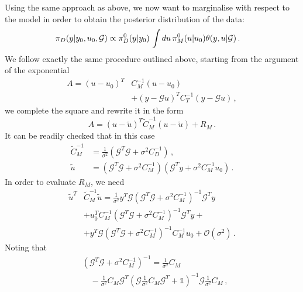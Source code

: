 Using the same approach as above, we now want to marginalise with respect to the model in order to obtain the posterior distribution of the data: 
\begin{align}
    \label{eq:MarginGaussModel}
    \pi_D(y|y_0,u_0,\mathcal{G}) 
    &\propto \pi_{D}^0(y|y_0) \, 
    \int du\, \pi_{M}^0(u|u_0) 
      \theta(y,u|\mathcal{G}) \, .
  \end{align}
We follow exactly the same procedure outlined above, starting from the argument
of the exponential
\begin{align}
    \label{eq:QuadFormModelInt}
    A = \left(u-u_0\right)^T &C_M^{-1} \left(u-u_0\right) \nonumber \\ 
    &+ \left(y-\mathcal{G}u\right)^T C_T^{-1} \left(y-\mathcal{G}u\right)\, ,
\end{align}
we complete the square and rewrite it in the form
\begin{equation}
    \label{eq:QuadFormModelIntSquare}
    A = \left(u-\tilde{u}\right)^T 
    \tilde{C}_M^{-1}
    \left(u-\tilde{u}\right) + R_M\, .
\end{equation}
It can be readily checked that in this case
\begin{align}
    \tilde{C}_M^{-1} &= \frac{1}{\sigma^2}
    \left(\mathcal{G}^T \mathcal{G} + \sigma^2 C_D^{-1}\right)\, , \\
    \tilde{u} &= \left(\mathcal{G}^T \mathcal{G} + \sigma^2 C_M^{-1}\right)
    \left(
        \mathcal{G}^T y + \sigma^2 C_M^{-1} u_0
    \right)\, .
\end{align}
In order to evaluate $R_M$, we need
\begin{equation}
    \label{eq:UtildeUtildeTerm}
    \begin{split}
    \tilde{u}^T &\tilde{C}_M^{-1} \tilde{u} 
    = \frac{1}{\sigma^2} y^T \mathcal{G} 
    \left(\mathcal{G}^T \mathcal{G} + \sigma^2 C_M^{-1}\right)^{-1}
    \mathcal{G}^T y  \\ 
    &+ u_0^T C_M^{-1} 
    \left(\mathcal{G}^T \mathcal{G} + \sigma^2 C_M^{-1}\right)^{-1}
    \mathcal{G}^T y + \\
    & + y^T \mathcal{G} \left(\mathcal{G}^T \mathcal{G} + \sigma^2 C_M^{-1}\right)^{-1} C_M^{-1} u_0 + \mathcal{O}(\sigma^2)\, .
    \end{split} 
\end{equation}
Noting that
\begin{align}
    \label{eq:InverseFromTarantola}
    &\left(\mathcal{G}^T \mathcal{G} + \sigma^2 C_M^{-1}\right)^{-1} =
    \frac{1}{\sigma^2} C_M \nonumber \\ 
    & \quad - \frac{1}{\sigma^2} C_M \mathcal{G}^T 
    \left(\mathcal{G} \frac{1}{\sigma^2} C_M \mathcal{G}^T 
        + \mathds{1}\right)^{-1} \mathcal{G}
    \frac{1}{\sigma^2} C_M\, ,
\end{align}
